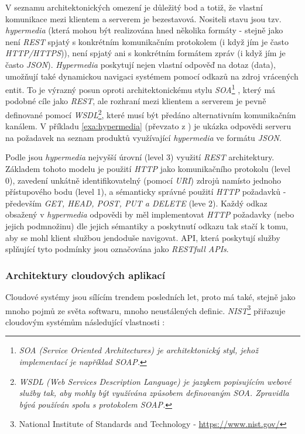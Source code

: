 V seznamu architektonických omezení je důležitý bod a totiž, že vlastní komunikace mezi klientem a serverem je bezestavová. Nositeli stavu jsou tzv. \textit{hypermedia} (která mohou být realizována hned několika formáty - stejně jako není \textit{REST} spjatý s konkrétním komunikačním protokolem (i když jím je často \textit{HTTP/HTTPS})), není spjatý ani s konkrétním formátem zpráv (i když jím je často \textit{JSON}). \textit{Hypermedia} poskytují nejen vlastní odpověď na dotaz (data), umožňují také dynamickou navigaci systémem pomocí odkazů na zdroj vrácených entit. To je výrazný posun oproti architektonickému stylu \textit{SOA}\footnote{\textit{SOA (Service Oriented Architectures) je architektonický styl, jehož implementací je například SOAP.}} , který má podobné cíle jako \textit{REST}, ale rozhraní mezi klientem a serverem je pevně definované pomocí \textit{WSDL}\footnote{\textit{WSDL (Web Services Description Language) je jazykem popisujícím webové služby tak, aby mohly být využívána způsobem definovaným \textit{SOA}. Zpravidla bývá používán spolu s protokolem \textit{SOAP}.}}, které musí být předáno alternativním komunikačním kanálem. V příkladu \ref{exa:hypermedia} (převzato z \cite{Spring18}) je ukázka odpovědi serveru na požadavek na seznam produktů využívající \textit{hypermedia} ve formátu \textit{JSON}.



Podle \cite{Fowler10} jsou \textit{hypermedia} nejvyšší úrovní (level 3) využití \textit{REST} architektury. Základem tohoto modelu je použití \textit{HTTP} jako komunikačního protokolu (level 0), zavedení unkátně identifikovatelný (pomocí \textit{URI}) zdrojů namísto jednoho přístupového bodu (level 1), a sémanticky správné použití \textit{HTTP} požadavků - především \textit{GET, HEAD, POST, PUT a DELETE} (leve 2). Každý odkaz obsažený v \textit{hypermedia} odpovědi by měl implementovat \textit{HTTP} požadavky (nebo jejich podmnožinu) dle jejich sémantiky a poskytnutí odkazu tak stačí k tomu, aby se mohl klient službou jendoduše navigovat. API, která poskytují služby splňující tyto podmínky jsou označována jako \textit{RESTfull APIs}.

\subsubsection{Architektury cloudových aplikací}
\label{sec:cloud}
Cloudové systémy jsou sílícím trendem posledních let, proto má také, stejně jako mnoho pojmů ze světa softwaru, mnoho neustálených definic. \textit{NIST}\footnote{National Institute of Standards and Technology - \url{https://www.nist.gov/}} přiřazuje cloudovým systémům následující vlastnosti \cite{Mell11} :

